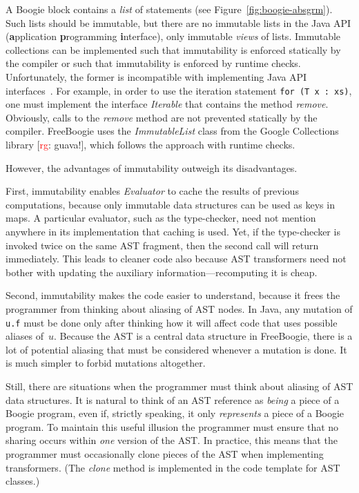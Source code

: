 \documentclass{llncs}
\newcommand{\jmlCode}{\lstinline[style=jml,basicstyle=\normalsize]}
\def\fb#1{{\bf #1}} %
\newcommand{\rg}[1]{{\small [\textcolor{red}{rg}: #1]}}
\begin{document}
A Boogie block contains a \emph{list} of statements (see
Figure~\ref{fig:boogie-absgrm}). Such lists should be immutable,
but there are no immutable lists in the Java API (\fb application
\fb programming \fb interface), only immutable \emph{views} of
lists. Immutable collections can be implemented such that
immutability is enforced statically by the compiler or such
that immutability is enforced by runtime checks. Unfortunately,
the former is incompatible with implementing Java API
interfaces~\cite{javaCollectFaq}. For example, in order to use
the iteration statement
\jmlCode|for (T x : xs)|,
one must implement the interface \textit{Iterable} that
contains the method \textit{remove}. Obviously, calls to
the \textit{remove} method are not prevented statically by
the compiler. FreeBoogie uses the \textit{ImmutableList}
class from the Google Collections~\cite{google-collect}
library \rg{guava!}, which follows the approach with runtime checks.

However, the advantages of immutability outweigh its
disadvantages.

First, immutability enables \textit{Evaluator} to cache the
results of previous computations, because only immutable data
structures can be used as keys in maps. A particular evaluator,
such as the type-checker, need not mention anywhere in its
implementation that caching is used. Yet, if the type-checker
is invoked twice on the same AST fragment, then the second call
will return immediately. This leads to cleaner code also because
AST transformers need not bother with updating the auxiliary
information---recomputing it is cheap.

Second, immutability makes the code easier to understand, because
it frees the programmer from thinking about aliasing of AST nodes.
In Java, any mutation of \jmlCode|u.f| must be done only after
thinking how it will affect code that uses possible aliases of~$u$.
Because the AST is a central data structure in FreeBoogie, there
is a lot of potential aliasing that must be considered whenever
a mutation is done. It is much simpler to forbid mutations altogether.

Still, there are situations when the programmer must think about aliasing
of AST data structures. It is natural to think of an AST reference as
\emph{being} a piece of a Boogie program, even if, strictly speaking, it
only \emph{represents} a piece of a Boogie program. To maintain this useful
illusion the programmer must ensure that no sharing occurs within
\emph{one} version of the AST\null. In practice, this means that the
programmer must occasionally clone pieces of the AST when implementing
transformers. (The \textit{clone} method is implemented in the code
template for AST classes.)
\end{document}
